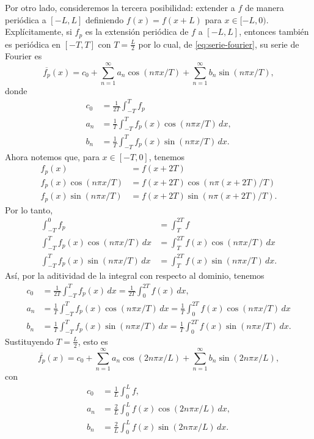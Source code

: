 \documentclass[11pt,letterpaper]{report}
\newcommand\<{\langle}
\renewcommand\>{\rangle}
\begin{document}
Por otro lado, consideremos la tercera posibilidad: extender a $f$ de
manera periódica a $[-L,L]$ definiendo $f(x)=f(x+L)$ para
$x\in[-L,0)$.
Explícitamente, si $f_p$ es la extensión periódica de $f$ a $[-L,L]$,
entonces también es periódica en $[-T,T]$ con $T=\frac{L}{2}$
por lo cual, de \eqref{eq:serie-fourier}, su serie de Fourier es
\[
  \overline{f_p}(x) = c_0
  + \sum_{n=1}^\infty a_n\cos(n\pi x/T)
  + \sum_{n=1}^\infty b_n\sin(n\pi x/T)
,
\]
donde
\begin{align*}
  c_0 &= \frac{1}{2T}\int_{-T}^T f_p \\
  a_n &= \frac{1}{T}\int_{-T}^T f_p(x)\cos(n\pi x/T)\,dx, \\
  b_n &= \frac{1}{T}\int_{-T}^T f_p(x)\sin(n\pi x/T)\,dx.
\end{align*}
Ahora notemos que, para $x\in[-T,0]$, tenemos
\begin{align*}
  f_p(x) &=f(x+2T) \\
  f_p(x)\cos(n\pi x/T) &=f(x+2T)\cos(n\pi(x+2T)/T) \\
  f_p(x)\sin(n\pi x/T) &=f(x+2T)\sin(n\pi(x+2T)/T).
\end{align*}
Por lo tanto,
\begin{align*}
  \int_{-T}^{0}f_p
    &=\int_{T}^{2T}f \\
  \int_{-T}^{T}f_p(x)\cos(n\pi x/T)\,dx
    &=\int_{T}^{2T}f(x)\cos(n\pi x/T)\,dx \\
  \int_{-T}^{T}f_p(x)\sin(n\pi x/T)\,dx
    &=\int_{T}^{2T}f(x)\sin(n\pi x/T)\,dx.
\end{align*}
Así, por la aditividad de la integral con respecto al dominio, tenemos
\begin{align*}
  c_0
  &= \frac{1}{2T}\int_{-T}^T f_p(x)\,dx
  = \frac{1}{2T}\int_{0}^{2T} f(x)\,dx, \\
  a_n
  &= \frac{1}{T}\int_{-T}^T f_p(x)\cos(n\pi x/T)\,dx
  = \frac{1}{T}\int_{0}^{2T} f(x)\cos(n\pi x/T)\,dx \\
  b_n
  &= \frac{1}{T}\int_{-T}^T f_p(x)\sin(n\pi x/T)\,dx
  = \frac{1}{T}\int_{0}^{2T} f(x)\sin(n\pi x/T)\,dx.
\end{align*}
Sustituyendo $T=\frac{L}{2}$, esto es
\begin{equation}
  \overline{f_p}(x) = c_0
  + \sum_{n=1}^\infty a_n\cos(2n\pi x/L)
  + \sum_{n=1}^\infty b_n\sin(2n\pi x/L)
,
\end{equation}
con
\begin{align*}
  c_0
  &= \frac{1}{L}\int_{0}^{L} f, \\
  a_n
  &= \frac{2}{L}\int_{0}^{L} f(x)\cos(2n\pi x/L)\,dx, \\
  b_n
  &= \frac{2}{L}\int_{0}^{L} f(x)\sin(2n\pi x/L)\,dx.
\end{align*}
\end{document}
